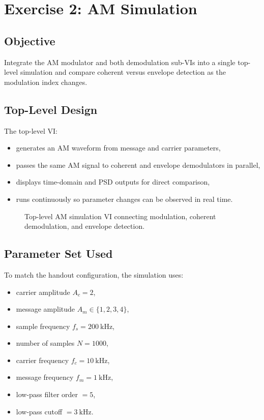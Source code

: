 \section{Exercise 2: AM Simulation}
\label{sec:lab2_ex2}

\subsection{Objective}

Integrate the AM modulator and both demodulation sub-VIs into a single top-level
simulation and compare coherent versus envelope detection as the modulation index
changes.

\subsection{Top-Level Design}

The top-level VI:
\begin{itemize}
\item generates an AM waveform from message and carrier parameters,
\item passes the same AM signal to coherent and envelope demodulators in
parallel,
\item displays time-domain and PSD outputs for direct comparison,
\item runs continuously so parameter changes can be observed in real time.
\end{itemize}

\begin{figure}[H]
\centering
{}
\caption{Top-level AM simulation VI connecting modulation, coherent demodulation, and envelope detection.}
\label{fig:lab2_am_top_level}
\end{figure}

\subsection{Parameter Set Used}

To match the handout configuration, the simulation uses:
\begin{itemize}
\item carrier amplitude $A_c = 2$,
\item message amplitude $A_m \in \{1,2,3,4\}$,
\item sample frequency $f_s = 200~\text{kHz}$,
\item number of samples $N = 1000$,
\item carrier frequency $f_c = 10~\text{kHz}$,
\item message frequency $f_m = 1~\text{kHz}$,
\item low-pass filter order $= 5$,
\item low-pass cutoff $= 3~\text{kHz}$.
\end{itemize}


